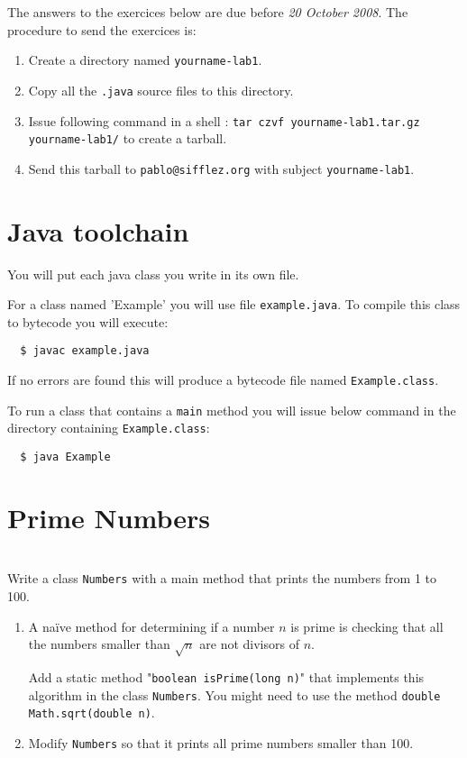 \documentclass{exercices}
\renewcommand{\|}{\url|}
\begin{document}

The answers to the exercices below are due before \emph{20 October 2008}. 
The procedure to send the exercices is:
\begin{enumerate}
  \item Create a directory named \verb!yourname-lab1!.
  \item Copy all the \verb!.java! source files to this directory.
  \item Issue following command in a shell : \verb!tar czvf yourname-lab1.tar.gz yourname-lab1/!
        to create a tarball.
  \item Send this tarball to \verb!pablo@sifflez.org! with subject \verb!yourname-lab1!.
\end{enumerate}

\section{Java toolchain}
You will put each java class you write in its own file.

For a class named 'Example' you will use file \verb!example.java!.
To compile this class to bytecode you will execute:
\begin{verbatim}
  $ javac example.java
\end{verbatim}
If no errors are found this will produce a bytecode file named \verb!Example.class!.

To run a class that contains a \verb!main! method you will issue below command
in the directory containing \verb!Example.class!:
\begin{verbatim}
  $ java Example
\end{verbatim}

\section{Prime Numbers}
\begin{exercice}\\ 
Write a class \verb!Numbers! with a main method that prints the numbers from 1 to 100.
\end{exercice}
\begin{exercice}
\begin{enumerate}
\item
A naïve method for determining if a number $n$ is prime is checking that all the numbers smaller
than $\sqrt{n}$ are not divisors of $n$.

Add a static method "\verb!boolean isPrime(long n)!" that implements this algorithm in the class \verb!Numbers!.
You might need to use the method \verb!double Math.sqrt(double n)!.
\item
 Modify \verb!Numbers! so that it prints all prime numbers smaller than 100.
\end{enumerate}
\end{exercice}
\end{document}

